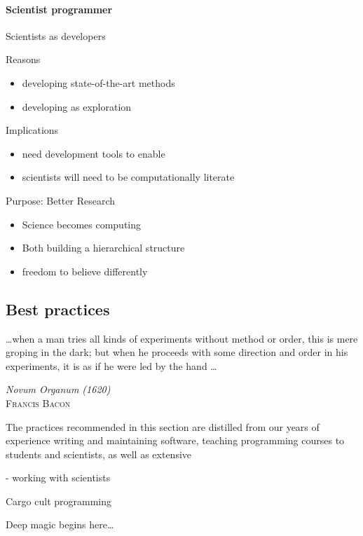 \documentclass[ChapterTOCs,krantz2]{krantz} %
\begin{document}
\paragraph{ {\bf Scientist programmer}}

Scientists as developers

Reasons

\begin{itemize}
\item  developing state-of-the-art methods
\item developing as exploration
\end{itemize}

Implications

\begin{itemize}
\item need development tools to enable
\item scientists will need to be computationally literate
\end{itemize}

Purpose:  Better Research

\begin{itemize}
\item Science becomes computing
\item Both building a hierarchical structure
\item freedom to believe differently
\end{itemize}




\subsection{Best practices}

\setlength{\epigraphrule}{0pt}
\setlength{\epigraphwidth}{.65\textwidth}
\epigraph%
{%
  \ldots when a man tries all kinds of experiments without method or
  order, this is mere groping in the dark; but when he proceeds with
  some direction and order in his experiments, it is as if he were
  led by the hand \ldots
}%
{\textit{Novum Organum (1620)}\\ \textsc{Francis Bacon} }

The practices recommended in this section are distilled
from our years of experience writing and maintaining software,
teaching programming courses to students and scientists, as well
as extensive 

- working with scientists

Cargo cult programming

Deep magic begins here\ldots
\end{document}
